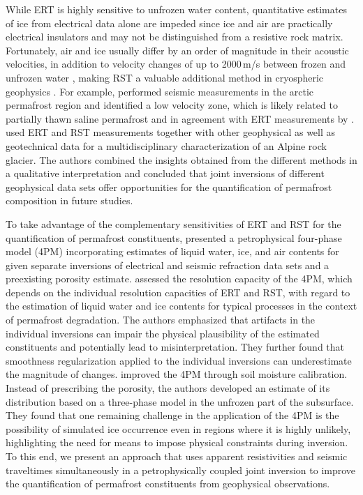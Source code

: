 \documentclass[extra]{gji}
\begin{document}
While ERT is highly sensitive to unfrozen water content, quantitative estimates of ice from electrical data alone are impeded since ice and air are practically electrical insulators and may not be distinguished from a resistive rock matrix.
Fortunately, air and ice usually differ by an order of magnitude in their acoustic velocities, in addition to velocity changes of up to 2000\,m/s between frozen and unfrozen water \citep{Hilbich2010}, making RST a valuable additional method in cryospheric geophysics \citep[e.g.,][]{Harris1986, Krautblatter2014, Steiner2019}.
For example, \cite{Dou2014} performed seismic measurements in the arctic permafrost region and identified a low velocity zone, which is likely related to partially thawn saline permafrost and in agreement with ERT measurements by \cite{Hubbard2013}.
\cite{Merz2016} used ERT and RST measurements together with other geophysical as well as geotechnical data for a multidisciplinary characterization of an Alpine rock glacier.
The authors combined the insights obtained from the different methods in a qualitative interpretation and concluded that joint inversions of different geophysical data sets offer opportunities for the quantification of permafrost composition in future studies.

To take advantage of the complementary sensitivities of ERT and RST for the quantification of permafrost constituents, \cite{Hauck2011} presented a petrophysical four-phase model (4PM) incorporating estimates of liquid water, ice, and air contents for given separate inversions of electrical and seismic refraction data sets and a preexisting porosity estimate.
\cite{Mewes2017} assessed the resolution capacity of the 4PM, which depends on the individual resolution capacities of ERT and RST, with regard to the estimation of liquid water and ice contents for typical processes in the context of permafrost degradation.
The authors emphasized that artifacts in the individual inversions can impair the physical plausibility of the estimated constituents and potentially lead to misinterpretation.
They further found that smoothness regularization applied to the individual inversions can underestimate the magnitude of changes.
\cite{Pellet2016} improved the 4PM through soil moisture calibration.
Instead of prescribing the porosity, the authors developed an estimate of its distribution based on a three-phase model in the unfrozen part of the subsurface.
They found that one remaining challenge in the application of the 4PM is the possibility of simulated ice occurrence even in regions where it is highly unlikely, highlighting the need for means to impose physical constraints during inversion.
To this end, we present an approach that uses apparent resistivities and seismic traveltimes simultaneously in a petrophysically coupled joint inversion to improve the quantification of permafrost constituents from geophysical observations.
\end{document}
